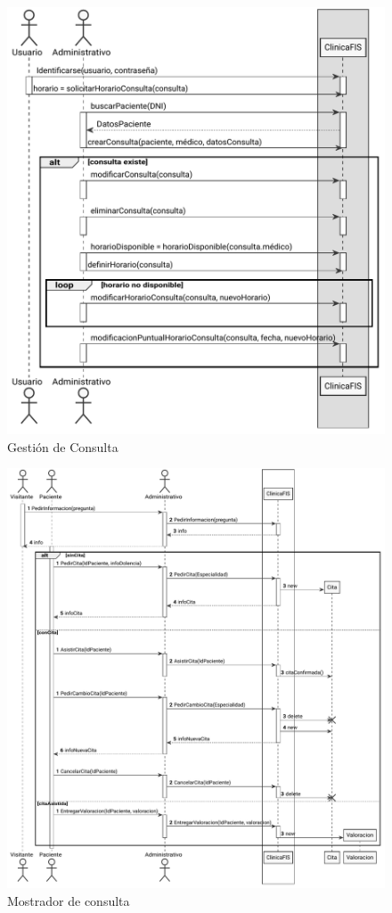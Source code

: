 \documentclass[11pt,a4paper]{article}
\begin{document}
\begin{figure}[H]
	\caption{Gestión de Consulta}
	\centering
	\includegraphics[width=\textwidth,height=\textheight,keepaspectratio]{diagramas/pdf/diagramaGestionConsulta.pdf}
\end{figure}

\begin{figure}[H]
	\caption{Mostrador de consulta}
	\centering
	\includegraphics[width=\textwidth,height=\textheight,keepaspectratio]{diagramas/pdf/diagramaMostrador.pdf}
\end{figure}
\end{document}
